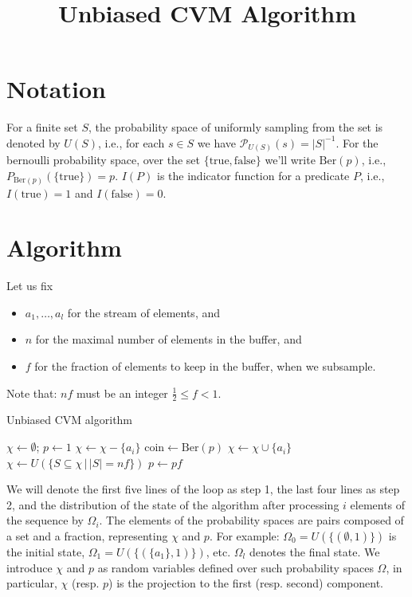 \documentclass{article}
\newcommand{\prob}{\mathcal P}
\theoremstyle{definition}
\begin{document}
\title{Unbiased CVM Algorithm}
\maketitle
\section{Notation}
For a finite set $S$, the probability space of uniformly sampling from the set is denoted by $U(S)$, i.e., for each $s \in S$ we have
$\prob_{U(S)}({s}) = |S|^{-1}$.
For the bernoulli probability space, over the set $\{\mathrm{true},\mathrm{false}\}$ we'll write $\mathrm{Ber}(p)$, i.e., $P_{\mathrm{Ber}(p)}(\{\mathrm{true}\}) = p$.
$I(P)$ is the indicator function for a predicate $P$, i.e., $I(\mathrm{true}) = 1$ and $I(\mathrm{false}) = 0$.
\section{Algorithm}
Let us fix 
\begin{itemize}
  \item $a_1,\ldots,a_l$ for the stream of elements, and
  \item $n$ for the maximal number of elements in the buffer, and
  \item $f$ for the fraction of elements to keep in the buffer, when we subsample.
\end{itemize}
Note that: $nf$ must be an integer $\frac{1}{2} \leq f < 1$.

\begin{algorithm}
\caption{Unbiased CVM algorithm}
\begin{algorithmic}
\State $\chi \gets \emptyset$; $p \gets 1$
  \State $\chi \gets \chi - \{a_i\}$
  \State $\mathrm{coin} \gets \mathrm{Ber}(p)$
    \State $\chi \gets \chi \cup \{a_i\}$
  \EndIf
    \State $\chi \gets U(\{ S \subseteq \chi \,|\, |S|=nf \})$
    \State $p \gets p f$
  \EndIf
\EndFor
\State {}
\end{algorithmic}
\end{algorithm}
We will denote the first five lines of the loop as step 1, the last four lines as step 2, and the distribution of the state of the algorithm after processing $i$ elements of the sequence by $\Omega_i$.
The elements of the probability spaces are pairs composed of a set and a fraction, representing $\chi$ and $p$. 
For example: $\Omega_0 = U(\{(\emptyset, 1)\})$ is the initial state, $\Omega_1 = U(\{(\{a_1\}, 1)\})$, etc. $\Omega_l$ denotes the final state. 
We introduce $\chi$ and $p$ as random variables defined over such probability spaces $\Omega$, in particular, $\chi$ (resp. $p$) is the projection to the first (resp. second) component.
\end{document}
